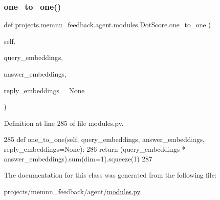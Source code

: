 \subsubsection{\texorpdfstring{one\+\_\+to\+\_\+one()}{one\_to\_one()}}
{\footnotesize\ttfamily def projects.\+memnn\+\_\+feedback.\+agent.\+modules.\+Dot\+Score.\+one\+\_\+to\+\_\+one (\begin{DoxyParamCaption}\item[{}]{self,  }\item[{}]{query\+\_\+embeddings,  }\item[{}]{answer\+\_\+embeddings,  }\item[{}]{reply\+\_\+embeddings = {\ttfamily None} }\end{DoxyParamCaption})}



Definition at line 285 of file modules.\+py.


\begin{DoxyCode}
285     \textcolor{keyword}{def }one\_to\_one(self, query\_embeddings, answer\_embeddings, reply\_embeddings=None):
286         \textcolor{keywordflow}{return} (query\_embeddings * answer\_embeddings).sum(dim=1).squeeze(1)
287 
\end{DoxyCode}


The documentation for this class was generated from the following file\+:\begin{DoxyCompactItemize}
\item 
projects/memnn\+\_\+feedback/agent/\hyperlink{projects_2memnn__feedback_2agent_2modules_8py}{modules.\+py}\end{DoxyCompactItemize}
